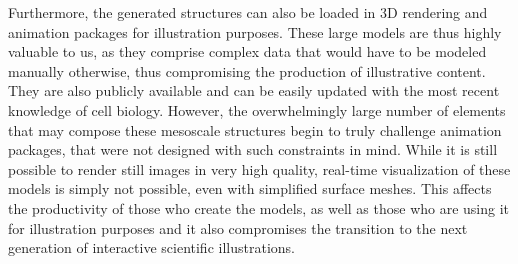 Furthermore, the generated structures can also be loaded in 3D rendering and animation packages for illustration purposes.
These large models are thus highly valuable to us, as they comprise complex data that would have to be modeled manually otherwise, thus compromising the production of illustrative content.
They are also publicly available and can be easily updated with the most recent knowledge of cell biology.
However, the overwhelmingly large number of elements that may compose these mesoscale structures begin to truly challenge animation packages, that were not designed with such constraints in mind.
While it is still possible to render still images in very high quality, real-time visualization of these models is simply not possible, even with simplified surface meshes. 
This affects the productivity of those who create the models, as well as those who are using it for illustration purposes and it also compromises the transition to the next generation of interactive scientific illustrations.

